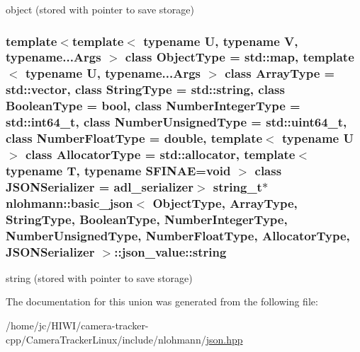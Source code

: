 object (stored with pointer to save storage) 

\subsubsection[{\texorpdfstring{string}{string}}]{\setlength{\rightskip}{0pt plus 5cm}template$<$template$<$ typename U, typename V, typename...\+Args $>$ class Object\+Type = std\+::map, template$<$ typename U, typename...\+Args $>$ class Array\+Type = std\+::vector, class String\+Type  = std\+::string, class Boolean\+Type  = bool, class Number\+Integer\+Type  = std\+::int64\+\_\+t, class Number\+Unsigned\+Type  = std\+::uint64\+\_\+t, class Number\+Float\+Type  = double, template$<$ typename U $>$ class Allocator\+Type = std\+::allocator, template$<$ typename T, typename S\+F\+I\+N\+A\+E=void $>$ class J\+S\+O\+N\+Serializer = adl\+\_\+serializer$>$ {\bf string\+\_\+t}$\ast$ {\bf nlohmann\+::basic\+\_\+json}$<$ Object\+Type, Array\+Type, String\+Type, Boolean\+Type, Number\+Integer\+Type, Number\+Unsigned\+Type, Number\+Float\+Type, Allocator\+Type, J\+S\+O\+N\+Serializer $>$\+::json\+\_\+value\+::string}\hypertarget{unionnlohmann_1_1basic__json_1_1json__value_a9856fb4271b50d738e14c5a9a2f05118}{}\label{unionnlohmann_1_1basic__json_1_1json__value_a9856fb4271b50d738e14c5a9a2f05118}


string (stored with pointer to save storage) 



The documentation for this union was generated from the following file\+:\begin{DoxyCompactItemize}
\item 
/home/jc/\+H\+I\+W\+I/camera-\/tracker-\/cpp/\+Camera\+Tracker\+Linux/include/nlohmann/\hyperlink{json_8hpp}{json.\+hpp}\end{DoxyCompactItemize}

